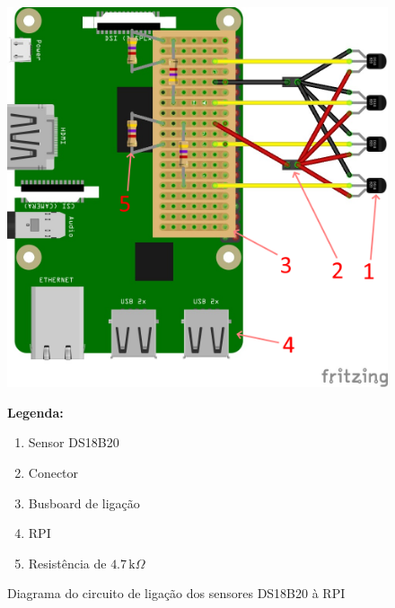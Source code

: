 \begin{figure}[H]
    \centering
    \begin{minipage}{0.6\textwidth}
        \includegraphics[width=\linewidth]{figures/circuit_dig.png}
    \end{minipage}%
    \hfill
    \begin{minipage}{0.35\textwidth}
        \small
        \textbf{Legenda:}
        \begin{enumerate}
            \item Sensor DS18B20 
            \item Conector
            \item Busboard de ligação
            \item RPI
            \item Resistência de $4.7\,\mathrm{k}\Omega$
        \end{enumerate}
    \end{minipage}
    \caption{Diagrama do circuito de ligação dos sensores DS18B20 à RPI}
    \label{fig:circuit_dig}
\end{figure}

